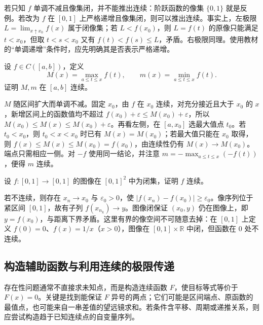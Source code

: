 \begin{notealert}[type=caution,title={严格单调与非严格单调}]
若只知 $f$ 单调不减且像集闭，并不能推出连续：阶跃函数的像集 $\{0,1\}$ 就是反例。若改为 $f$ 在 $[0,1]$ 上严格递增且像集闭，则可以推出连续。事实上，左极限 $L=\lim_{x\uparrow x_0}f(x)$ 属于闭像集；若 $L<f(x_0)$，则 $L=f(t)$ 的原像只能满足 $t<x_0$，但取 $t<s<x_0$ 又有 $f(t)<f(s)\le L$，矛盾。右极限同理。使用教材的“单调递增”条件时，应先明确其是否表示严格递增。
\end{notealert}

\begin{example}
\label{ex:pei-running-extrema}
设 $f\in C([a,b])$，定义
\[
M(x)=\max_{a\le t\le x}f(t),\qquad m(x)=\min_{a\le t\le x}f(t).
\]
证明 $M,m$ 在 $[a,b]$ 连续。
\end{example}

\begin{solve}
$M$ 随区间扩大而单调不减。固定 $x_0$，由 $f$ 在 $x_0$ 连续，对充分接近且大于 $x_0$ 的 $x$，新增区间上的函数值均不超过 $f(x_0)+\varepsilon\le M(x_0)+\varepsilon$，所以 $M(x_0)\le M(x)\le M(x_0)+\varepsilon$。再看左侧，在 $[a,x_0]$ 选最大值点 $t_0$。若 $t_0<x_0$，则 $t_0<x<x_0$ 时已有 $M(x)=M(x_0)$；若最大值只能在 $x_0$ 取得，则 $f(x)\le M(x)\le M(x_0)=f(x_0)$，由连续性仍有 $M(x)\to M(x_0)$。端点只需相应一侧。对 $-f$ 使用同一结论，并注意 $m=-\max_{a\le t\le x}(-f(t))$，便得 $m$ 连续。
\end{solve}

\begin{example}
设 $f:[0,1]\to[0,1]$ 的图像在 $[0,1]^2$ 中为闭集，证明 $f$ 连续。
\end{example}

\begin{solve}
若不连续，则存在 $x_n\to x_0$ 与 $\varepsilon_0>0$，使 $|f(x_n)-f(x_0)|\ge\varepsilon_0$。像序列位于紧区间 $[0,1]$，故有子列 $f(x_{n_k})\to y$。图像闭保证 $(x_0,y)$ 仍在图像上，即 $y=f(x_0)$，与距离下界矛盾。这里有界的像空间不可随意去掉：在 $[0,1]$ 上定义 $f(0)=0$、$f(x)=1/x$（$x>0$），图像在 $[0,1]\times\mathbb R$ 中闭，但函数在 $0$ 处不连续。
\end{solve}

\subsection{构造辅助函数与利用连续的极限传递}

存在性问题通常不直接求未知点，而是构造连续函数 $F$，使目标等式等价于 $F(x)=0$。关键是找到能保证 $F$ 异号的两点；它们可能是区间端点、原函数的最值点，也可能来自一串差值的望远镜求和。若条件含平移、周期或递推关系，则应尝试构造趋于已知连续点的自变量序列。

